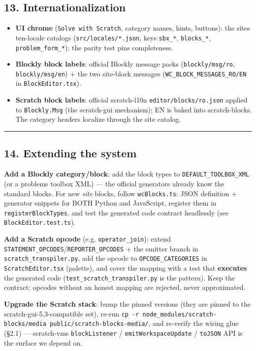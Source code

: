 \documentclass[
]{article}
\providecommand{\tightlist}{%
  \setlength{\itemsep}{0pt}\setlength{\parskip}{0pt}}
\begin{document}
\subsection{13. Internationalization}\label{13-internationalization}

\begin{itemize}
\tightlist
\item
  \textbf{UI chrome} (\texttt{Solve\ with\ Scratch}, category names,
  hints, buttons): the site\textquotesingle s ten-locale catalogs
  (\texttt{src/locales/*.json}, keys \texttt{sbx\_*},
  \texttt{blocks\_*}, \texttt{problem\_form\_*}); the parity test pins
  completeness.
\item
  \textbf{Blockly block labels}: official Blockly message packs
  (\texttt{blockly/msg/ro}, \texttt{blockly/msg/en}) + the two
  site-block messages (\texttt{WC\_BLOCK\_MESSAGES\_RO/EN} in
  \texttt{BlockEditor.tsx}).
\item
  \textbf{Scratch block labels}: official scratch-l10n
  \texttt{editor/blocks/ro.json} applied to \texttt{Blockly.Msg} (the
  scratch-gui mechanism); EN is baked into scratch-blocks. The category
  headers localize through the site catalog.
\end{itemize}

\begin{center}\rule{0.5\linewidth}{0.5pt}\end{center}

\subsection{14. Extending the system}\label{14-extending-the-system}

\textbf{Add a Blockly category/block}: add the block types to
\texttt{DEFAULT\_TOOLBOX\_XML} (or a problem\textquotesingle s toolbox
XML) --- the official generators already know the standard blocks. For
new \emph{site} blocks, follow \texttt{wcBlocks.ts}: JSON definition +
generator snippets for BOTH Python and JavaScript, register them in
\texttt{registerBlockTypes}, and test the generated code contract
headlessly (see \texttt{BlockEditor.test.ts}).

\textbf{Add a Scratch opcode} (e.g. \texttt{operator\_join}): extend
\texttt{STATEMENT\_OPCODES}/\texttt{REPORTER\_OPCODES} + the emitter
branch in \texttt{scratch\_transpiler.py}, add the opcode to
\texttt{OPCODE\_CATEGORIES} in \texttt{ScratchEditor.tsx} (palette), and
cover the mapping with a test that \textbf{executes} the generated code
(\texttt{test\_scratch\_transpiler.py} is the pattern). Keep the
contract: opcodes without an honest mapping are rejected, never
approximated.

\textbf{Upgrade the Scratch stack}: bump the pinned versions (they are
pinned to the scratch-gui-5.3-compatible set), re-run
\texttt{cp\ -r\ node\_modules/scratch-blocks/media\ public/scratch-blocks-media/},
and re-verify the wiring glue (§2.1) --- scratch-vm\textquotesingle s
\texttt{blockListener} / \texttt{emitWorkspaceUpdate} / \texttt{toJSON}
API is the surface we depend on.
\end{document}
